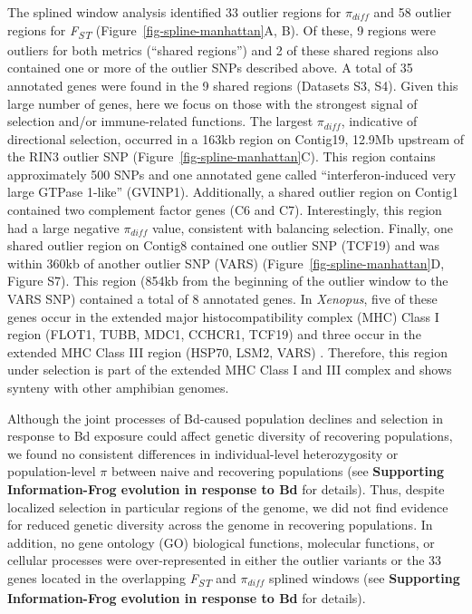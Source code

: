 \documentclass[9pt,twocolumn,twoside,lineno]{pnas-new}
\begin{document}
The splined window analysis identified 33 outlier regions for
\(\pi_{diff}\) and 58 outlier regions for \emph{F\textsubscript{ST}}
(Figure~\ref{fig-spline-manhattan}A, B). Of these, 9 regions were
outliers for both metrics (``shared regions'') and 2 of these shared
regions also contained one or more of the outlier SNPs described above.
A total of 35 annotated genes were found in the 9 shared regions
(Datasets S3, S4). Given this large number of genes, here we focus on
those with the strongest signal of selection and/or immune-related
functions. The largest \(\pi_{diff}\), indicative of directional
selection, occurred in a 163kb region on Contig19, 12.9Mb upstream of
the RIN3 outlier SNP (Figure~\ref{fig-spline-manhattan}C). This region
contains approximately 500 SNPs and one annotated gene called
``interferon-induced very large GTPase 1-like'' (GVINP1). Additionally,
a shared outlier region on Contig1 contained two complement factor genes
(C6 and C7). Interestingly, this region had a large negative
\(\pi_{diff}\) value, consistent with balancing selection. Finally, one
shared outlier region on Contig8 contained one outlier SNP (TCF19) and
was within 360kb of another outlier SNP (VARS)
(Figure~\ref{fig-spline-manhattan}D, Figure S7).
This region (854kb from the beginning of the outlier window to the VARS
SNP) contained a total of 8 annotated genes. In \emph{Xenopus}, five of
these genes occur in the extended major histocompatibility complex (MHC)
Class I region (FLOT1, TUBB, MDC1, CCHCR1, TCF19) and three occur in the
extended MHC Class III region (HSP70, LSM2, VARS) \citep{ohta2006}.
Therefore, this region under selection is part of the extended MHC Class
I and III complex and shows synteny with other amphibian genomes.

Although the joint processes of Bd-caused population declines and
selection in response to Bd exposure could affect genetic diversity of
recovering populations, we found no consistent differences in
individual-level heterozygosity or population-level \(\pi\) between
naive and recovering populations (see \textbf{Supporting
Information-Frog evolution in response to Bd} for details). Thus,
despite localized selection in particular regions of the genome, we did
not find evidence for reduced genetic diversity across the genome in
recovering populations. In addition, no gene ontology (GO) biological
functions, molecular functions, or cellular processes were
over-represented in either the outlier variants or the 33 genes located
in the overlapping \emph{F\textsubscript{ST}} and \(\pi_{diff}\) splined
windows (see \textbf{Supporting Information-Frog evolution in response
to Bd} for details).
\end{document}
